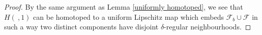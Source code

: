 \documentclass{amsart}
\theoremstyle{definition}
\numberwithin{figure}{section}
\numberwithin{equation}{section}
\def\Int{\mathrm{Int}}
\begin{document}
\begin{proof}

By the same argument as  Lemma \ref{uniformly homotoped}, we see that $H(\ ,1)$ can be homotoped to a uniform Lipschitz map which embeds $\mathcal F_b \cup \mathcal F$ in such a way two distinct components have disjoint $\delta$-regular neighbourhoods.
%
%
   \end{proof}

\end{document}
